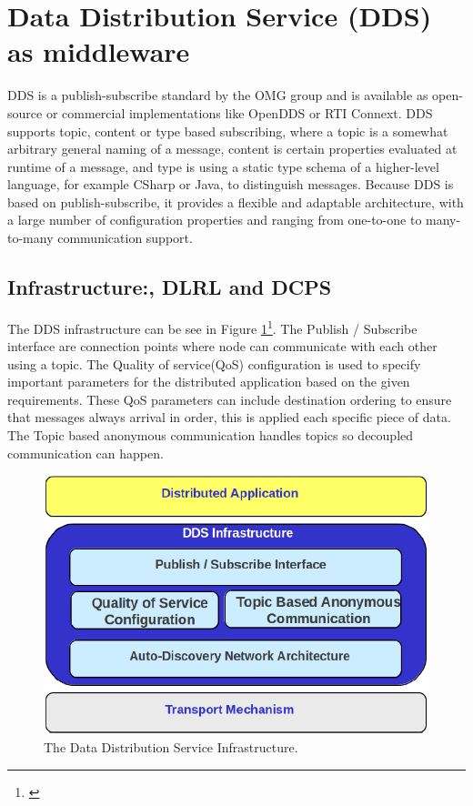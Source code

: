 \section{Data Distribution Service (DDS) as middleware}

DDS is a publish-subscribe standard by the OMG group and is available as open-source or commercial implementations like OpenDDS or RTI Connext. DDS supports topic, content or type based subscribing, where a topic is a somewhat arbitrary general naming of a message, content is certain properties evaluated at runtime of a message, and type is using a static type schema of a higher-level language, for example CSharp or Java, to distinguish messages. Because DDS is based on publish-subscribe, it provides a flexible and adaptable architecture, with a large number of configuration properties and ranging from one-to-one to many-to-many communication support.

\subsection{Infrastructure:, DLRL and DCPS}
The DDS infrastructure can be see in Figure \ref{fig:DDSIinfrastructure}\footnote{\cite{Lopez-Vega2013}}. The Publish / Subscribe interface are connection points where node can communicate with each other using a topic. The Quality of service(QoS) configuration is used to specify important parameters for the distributed application based on the given requirements. These QoS parameters can include destination ordering to ensure that messages always arrival in order, this is applied each specific piece of data. The Topic based anonymous communication handles topics so  decoupled communication can happen.

\begin{figure}[ht!]
	\centering
	\includegraphics[scale=0.8]{middleware/DDSIinfrastructure.png}
	\caption{The Data Distribution Service Infrastructure.}
	\label{fig:DDSIinfrastructure}
\end{figure}

